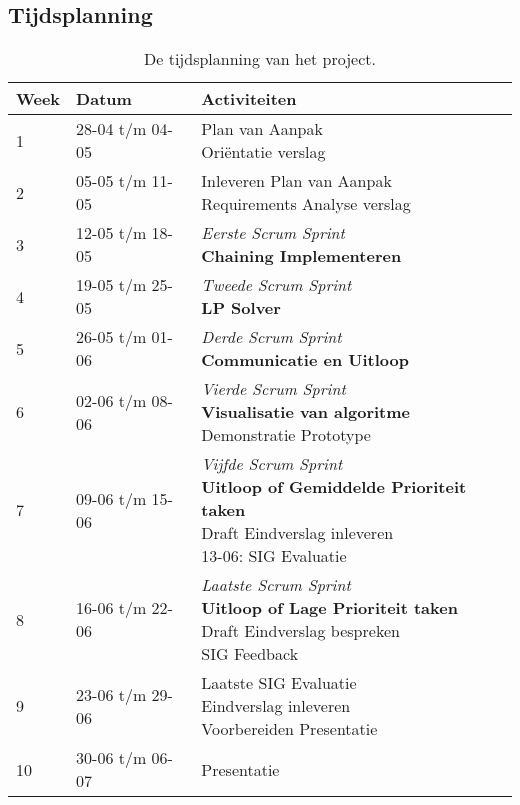 \begin{appendices}
	\section{Tijdsplanning} \label{app:A}
	\begin{table}[!h]
	\def\arraystretch{1.5}
	\begin{tabularx}{\textwidth}{| p{1cm} | p{3cm}| X |}
	\hline
	\textbf{Week} & \textbf{Datum} & \textbf{Activiteiten} \\ \hline
	1 & 28-04 t/m 04-05 & \specialcell{Plan van Aanpak\\Ori\"entatie verslag}\\ \hline
	2 & 05-05 t/m 11-05 & \specialcell{Inleveren Plan van Aanpak\\Requirements Analyse verslag}\\ \hline
	3 & 12-05 t/m 18-05 & \specialcell{\textit{Eerste Scrum Sprint}\\\textbf{Chaining Implementeren}}\\ \hline
	4 & 19-05 t/m 25-05 & \specialcell{\textit{Tweede Scrum Sprint}\\\textbf{LP Solver}}\\ \hline
	5 & 26-05 t/m 01-06 & \specialcell{\textit{Derde Scrum Sprint}\\\textbf{Communicatie en Uitloop}}\\ \hline
	6 & 02-06 t/m 08-06 & \specialcell{\textit{Vierde Scrum Sprint}\\\textbf{Visualisatie van algoritme}\\Demonstratie Prototype}\\ \hline
	7 & 09-06 t/m 15-06 & \specialcell{\textit{Vijfde Scrum Sprint}\\\textbf{Uitloop of Gemiddelde Prioriteit taken}\\Draft Eindverslag inleveren\\13-06: SIG Evaluatie}\\ \hline
	8 & 16-06 t/m 22-06 & \specialcell{\textit{Laatste Scrum Sprint}\\\textbf{Uitloop of Lage Prioriteit taken}\\Draft Eindverslag bespreken\\SIG Feedback}\\ \hline
	9 & 23-06 t/m 29-06 & \specialcell{Laatste SIG Evaluatie\\Eindverslag inleveren\\Voorbereiden Presentatie}\\ \hline
	10 & 30-06 t/m 06-07 & Presentatie\\ \hline
	\end{tabularx}
	\caption{De tijdsplanning van het project.}
	\end{table}

\end{appendices}